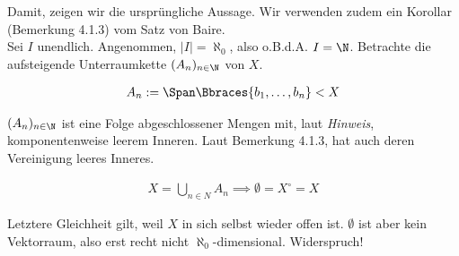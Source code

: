 \begin{solution}
Damit, zeigen wir die ursprüngliche Aussage.
Wir verwenden zudem ein Korollar (Bemerkung 4.1.3) vom Satz von Baire. \\

Sei $I$ unendlich.
Angenommen, $|I| = \aleph_0$, also o.B.d.A. $I = \N$.
Betrachte die aufsteigende Unterraumkette $(A_n)_{n \in \N}$ von $X$.

\begin{align*}
  A_n := \Span \Bbraces{b_1, \ldots, b_n} < X
\end{align*}

$(A_n)_{n \in \N}$ ist eine Folge abgeschlossener Mengen mit, laut \textit{Hinweis}, komponentenweise leerem Inneren.
Laut Bemerkung 4.1.3, hat auch deren Vereinigung leeres Inneres.

\begin{align*}
  X = \bigcup_{n \in N} A_n
  \implies
  \emptyset = X^\circ = X
\end{align*}

Letztere Gleichheit gilt, weil $X$ in sich selbst wieder offen ist.
$\emptyset$ ist aber kein Vektorraum, also erst recht nicht $\aleph_0$-dimensional.
Widerspruch!

\end{solution}
